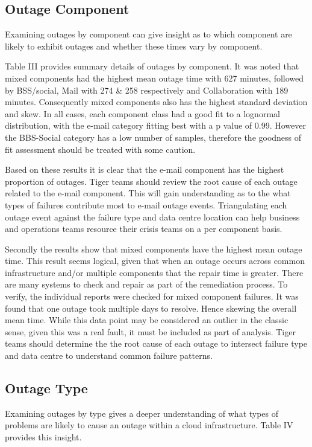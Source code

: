 \documentclass[conference]{IEEEtran}
\begin{document}
\subsection{Outage Component}

Examining outages by component can give insight as to which component are likely to exhibit outages and whether these times vary by component. \par

Table III provides summary details of outages by component. It was noted that mixed components had the highest mean outage time with 627 minutes, followed by BSS/social, Mail with 274 \& 258 respectively and Collaboration with 189 minutes. Consequently mixed components also has the highest standard deviation and skew. In all cases, each component class had a good fit to a lognormal distribution, with the e-mail category fitting best with a p value of 0.99. However the BBS-Social category has a low number of samples, therefore the goodness of fit assessment should be treated with some caution. \par

Based on these results it is clear that the e-mail component has the highest proportion of outages. Tiger teams should review the root cause of each outage related to the e-mail component.  This will gain understanding as to the what types of failures contribute most to e-mail outage events. Triangulating each outage event against the failure type and data centre location can help business and operations teams resource their crisis teams on a per component basis.

Secondly the results show that mixed components have the highest mean outage time. This result seems logical, given that when an outage occurs across common infrastructure and/or multiple components that the repair time is greater. There are many systems to check and repair as part of the remediation process. To verify, the individual reports were checked for mixed component failures. It was found that one outage took multiple days to resolve. Hence skewing the overall mean time. While this data point may be considered an outlier in the classic sense, given this was a real fault, it must be included as part of analysis. Tiger teams should determine the the root cause of each outage to intersect failure type and data centre to understand common failure patterns. \par


\subsection{Outage Type}
Examining outages by type gives a deeper understanding of what types of problems are likely to cause an outage within a cloud infrastructure. Table IV provides this insight. \par
\end{document}
